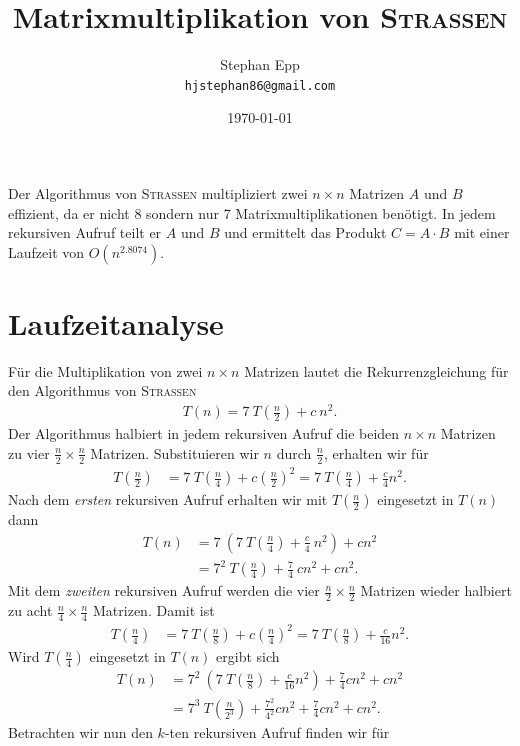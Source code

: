 \documentclass{scrartcl}
\title{Matrixmultiplikation von \normalfont\scshape{Strassen}}
\author{Stephan Epp\\\texttt{hjstephan86@gmail.com}}
\date{\today}
\numberwithin{equation}{section}
\begin{document}
\maketitle
\vspace{5em}
\tableofcontents
\newpage
Der Algorithmus von \textsc{Strassen} multipliziert zwei $n \times n$ Matrizen $A$ und $B$ effizient, da er nicht 8 sondern nur 7 Matrixmultiplikationen benötigt. In jedem rekursiven Aufruf teilt er $A$ und $B$ und ermittelt das Produkt $C = A \cdot B$ mit einer Laufzeit von $O(n^{2.8074})$.
\section{Laufzeitanalyse}
Für die Multiplikation von zwei $n \times n$ Matrizen lautet die Rekurrenzgleichung für den Algorithmus von \textsc{Strassen}
\begin{align*}
	T(n) = 7 \: T(\tfrac{n}{2}) + c\: n^2.
\end{align*}
Der Algorithmus halbiert in jedem rekursiven Aufruf die beiden $n \times n$ Matrizen zu vier $\tfrac{n}{2} \times \tfrac{n}{2}$ Matrizen. Substituieren wir $n$ durch $\tfrac{n}{2}$, erhalten wir für
\begin{align*}
	T(\tfrac{n}{2}) &= 7 \: T(\tfrac{n}{4}) + c(\tfrac{n}{2})^2 = 7 \: T(\tfrac{n}{4}) + \tfrac{c}{4}n^2.
\end{align*}
Nach dem \textit{ersten} rekursiven Aufruf erhalten wir mit $T(\frac{n}{2})$ eingesetzt in $T(n)$ dann
\begin{align*}
	T(n) &= 7 \: (7 \: T(\tfrac{n}{4}) + \tfrac{c}{4} \: n^2) + c n^2 \\
	&= 7^2\: T(\tfrac{n}{4}) + \tfrac{7}{4} \: cn^2 + c n^2.
\end{align*}
Mit dem \textit{zweiten} rekursiven Aufruf werden die vier $\tfrac{n}{2} \times \tfrac{n}{2}$ Matrizen wieder halbiert zu acht $\tfrac{n}{4} \times \tfrac{n}{4}$ Matrizen. Damit ist
\begin{align*}
	T(\tfrac{n}{4}) &= 7 \: T(\tfrac{n}{8}) + c(\tfrac{n}{4})^2 = 7 \: T(\tfrac{n}{8}) + \tfrac{c}{16}n^2.
\end{align*}
Wird $T(\tfrac{n}{4})$ eingesetzt in $T(n)$ ergibt sich
\begin{align*}
	T(n) &= 7^2\: (7 \: T(\tfrac{n}{8}) + \tfrac{c}{16}n^2) + \tfrac{7}{4}cn^2 + c n^2 \\
	&= 7^3\: T(\tfrac{n}{2^3}) + \tfrac{7^2}{4^2}cn^2 + \tfrac{7}{4}cn^2 + c n^2.
\end{align*}
Betrachten wir nun den $k$-ten rekursiven Aufruf finden wir für 
\end{document}
